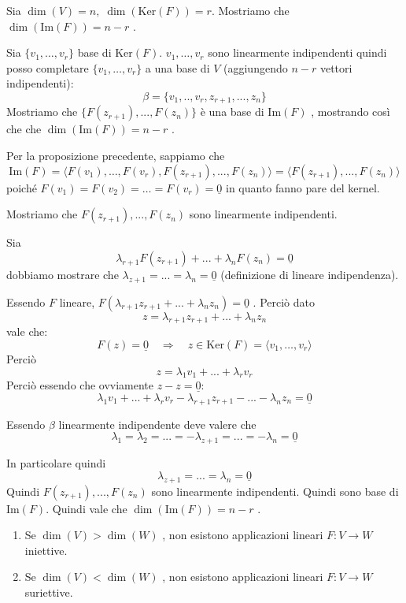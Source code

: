 \documentclass[
  a4paper,
]{article}
\providecommand{\tightlist}{%
  \setlength{\itemsep}{0pt}\setlength{\parskip}{0pt}}
\providecommand{\tightlist}{}
\begin{document}
\begin{proofbox}
Sia \(\dim(V) = n, \; \dim(\text{Ker}(F)) = r\). Mostriamo che
\(\dim(\text{Im}(F)) = n - r\) .

Sia \(\{v_1, \dots, v_r \}\) base di \(\text{Ker}(F)\).
\(v_1, \dots, v_r\) sono linearmente indipendenti quindi posso
completare \(\{v_1, \dots, v_r \}\) a una base di \(V\) (aggiungendo
\(n-r\) vettori indipendenti): \[
\beta = \{v_1, .., v_r, z_{r+1},..., z_{n}\}
\] Mostriamo che \(\{F(z_{r+1}), ..., F(z_n)\}\) è una base di
\(\text{Im}(F)\) , mostrando così che che \(\dim(\text{Im}(F)) = n - r\)
.

Per la proposizione precedente, sappiamo che \[
\text{Im}(F) = \langle F(v_1), \dots , F(v_r), F(z_{r+1}), ..., F(z_n) \rangle = \langle F(z_{r+1}), ..., F(z_n)\rangle
\]poiché \(F(v_1) = F(v_2) = \dots = F(v_r) = \underline{0}\) in quanto
fanno pare del kernel.

Mostriamo che \(F(z_{r+1}), ..., F(z_n)\) sono linearmente indipendenti.

Sia \[
\lambda_{r+1} F(z_{r+1})+ ...+ \lambda_{n}F(z_n) = \underline{0}
\] dobbiamo mostrare che
\(\lambda_{z+1} = ... = \lambda_n = \underline{0}\) (definizione di
lineare indipendenza).

Essendo \(F\) lineare,
\(F(\lambda_{r+1}z_{r+1} + ...+ \lambda_{n} z_n) = \underline{0}\) .
Perciò dato \[
z = \lambda_{r+1}z_{r+1} + ...+ \lambda_{n} z_n
\] vale che: \[
F(z) = \underline{0} \quad\Longrightarrow \quad z \in \text{Ker}(F) = \langle v_1, \dots,  v_r \rangle
\] Perciò \[
z = \lambda_1 v_1 + ... + \lambda_r v_r
\] Perciò essendo che ovviamente \(z - z = \underline{0}\): \[
\lambda_1 v_1 + ... + \lambda_r v_r - \lambda_{r+1}z_{r+1} - ...- \lambda_{n} z_n = \underline{0}
\]

Essendo \(\beta\) linearmente indipendente deve valere che \[
\lambda_1 = \lambda_2 = ... = -\lambda_{z+1} = ... = - \lambda_n = \underline{0}
\]

In particolare quindi \[
\lambda_{z+1} = ... = \lambda_n = \underline{0}
\] Quindi \(F(z_{r+1}), ..., F(z_n)\) sono linearmente indipendenti.
Quindi sono base di \(\text{Im}(F)\). Quindi vale che
\(\dim(\text{Im}(F)) = n - r\) .
\end{proofbox}

\begin{propositionbox}
\begin{enumerate}
\def\labelenumi{\arabic{enumi}.}
\tightlist
\item
  Se \(\dim(V) > \dim(W)\) , non esistono applicazioni lineari
  \(F: V \to W\) iniettive.
\item
  Se \(\dim(V) < \dim(W)\) , non esistono applicazioni lineari
  \(F: V \to W\) suriettive.
\end{enumerate}
\end{propositionbox}
\end{document}
